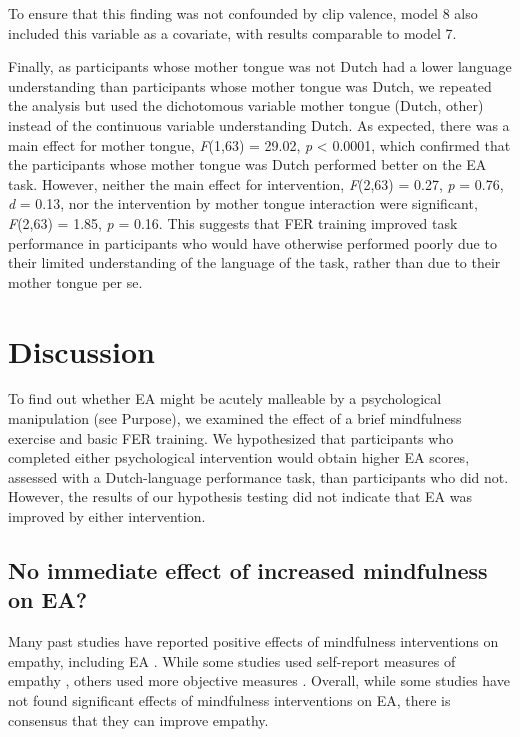 \documentclass[authordate, empirical]{jote-new-article}
\begin{document}
	To ensure that this finding was not confounded by clip valence, model 8 also included this variable as a covariate, with results comparable to model 7.



	Finally, as participants whose mother tongue was not Dutch had a lower language understanding than participants whose mother tongue was Dutch, we repeated the analysis but used the dichotomous variable mother tongue (Dutch, other) instead of the continuous variable understanding Dutch. As expected, there was a main effect for mother tongue, \emph{F}(1,63) = 29.02, \emph{p} < 0.0001, which confirmed that the participants whose mother tongue was Dutch performed better on the EA task. However, neither the main effect for intervention, \emph{F}(2,63) = 0.27, \emph{p} = 0.76, \emph{d} = 0.13, nor the intervention by mother tongue interaction were significant, \emph{F}(2,63) = 1.85, \emph{p} = 0.16. This suggests that FER training improved task performance in participants who would have otherwise performed poorly due to their limited understanding of the language of the task, rather than due to their mother tongue per se.



	\section{Discussion}



	To find out whether EA might be acutely malleable by a psychological manipulation (see Purpose), we examined the effect of a brief mindfulness exercise and basic FER training. We hypothesized that participants who completed either psychological intervention would obtain higher EA scores, assessed with a Dutch-language performance task, than participants who did not. However, the results of our hypothesis testing did not indicate that EA was improved by either intervention.



	\subsection{No immediate effect of increased mindfulness on EA?}



	Many past studies have reported positive effects of mindfulness interventions on empathy, including EA \parencites[e.g.,][]{Lam2011}. While some studies used self-report measures of empathy \parencites{Birnie2010}{Shapiro1998}, others used more objective measures \parencites[e.g.,][]{Mascaro2013}. Overall, while some studies have not found significant effects of mindfulness interventions on EA, there is consensus that they can improve empathy.
\end{document}
